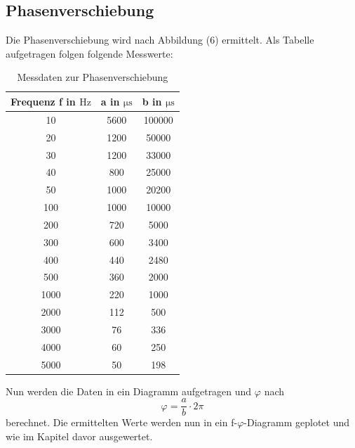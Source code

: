     \subsection{Phasenverschiebung}
    Die Phasenverschiebung wird nach Abbildung (6) ermittelt. Als Tabelle aufgetragen folgen folgende Messwerte:
\begin{table}
        \centering
        \begin{tabular}{c c c}
            \toprule
            {Frequenz f in $\si{\hertz}$} & {a in $\si{\micro\second}$} & {b in $\si{\micro\second}$}\\
            \midrule
            10   & 5600 & 100000 \\
            20   & 1200 &  50000 \\
            30   & 1200 &  33000 \\
            40   &  800 &  25000 \\
            50   & 1000 &  20200 \\
            100  & 1000 &  10000 \\
            200  &  720 &   5000 \\
            300  &  600 &   3400 \\
            400  &  440 &   2480 \\
            500  &  360 &   2000 \\
            1000 &  220 &   1000 \\
            2000 &  112 &    500 \\
            3000 &   76 &    336 \\
            4000 &   60 &    250 \\
            5000 &   50 &    198 \\
            \bottomrule
        \end{tabular}
    \caption{Messdaten zur Phasenverschiebung}
    \label{tab:c}
    \end{table}

\noindent
    Nun werden die Daten in ein Diagramm aufgetragen und $\varphi$ nach 
    \begin{equation}
	\varphi = \frac{a}{b} \cdot 2\pi
	\label{eqn:4b-phase}
    \end{equation}
    berechnet. Die ermittelten Werte werden nun in ein f-$\varphi$-Diagramm geplotet und wie im Kapitel davor ausgewertet.

